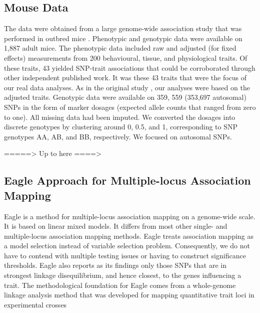 \documentclass{article}
\begin{document}
\subsection{Mouse Data}

The data were obtained from a large genome-wide association study that was performed in outbred mice \cite{nicod2016genome}. 
Phenotypic and genotypic data were available on 1,887 adult mice. 
The phenotypic data included raw and adjusted (for fixed effects) measurements from 200 behavioural, tissue, and physiological traits.  
Of these traits, 
43 yielded SNP-trait associations that could be corroborated through other independent published work. It was these 
43 traits that were the focus of our real data analyses. As in the original study  \cite{nicod2016genome}, our analyses 
were based on the adjusted traits.
Genotypic data were available on 359, 559 (353,697 autosomal) SNPs in the 
form of marker dosages (expected allele counts that ranged from zero to one). All missing data had been imputed. 
We converted the dosages into discrete genotypes 
by clustering around 0, 0.5, and 1, corresponding to SNP genotypes AA, AB, and BB, respectively. We focused on autosomal SNPs.

=====> Up to here ====>



\subsection{Eagle Approach for Multiple-locus Association Mapping}

Eagle is a method for multiple-locus association mapping on a genome-wide scale. It is based on linear mixed models. It differs from most other single- and multiple-locus association mapping methods. Eagle treats association mapping as a model selection instead of variable selection problem. Consequently,  we do not have to contend with multiple testing issues or having to construct significance thresholds.  
Eagle also 
reports as its findings only those SNPs that are in strongest linkage disequilibrium, and hence closest, to the genes influencing a trait. 
The methodological foundation for Eagle comes from a whole-genome linkage analysis method that was developed for mapping 
quantitative trait loci in experimental crosses \cite{verbyla2007analysis} 
\end{document}
